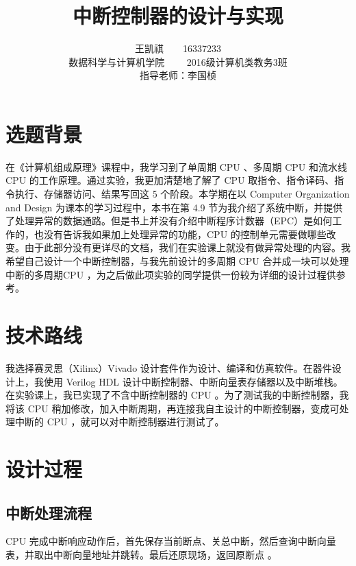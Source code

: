 \documentclass{article}
\begin{document}
\title{中断控制器的设计与实现}
\author {王凯祺\ \ \ \ 16337233 \\
数据科学与计算机学院 \ \ \ \ 2016级计算机类教务3班 \\
指导老师：李国桢
}
\maketitle

\tableofcontents

\newpage

\section{选题背景}

在《计算机组成原理》课程中，我学习到了单周期 CPU 、多周期 CPU 和流水线 CPU 的工作原理。通过实验，我更加清楚地了解了 CPU 取指令、指令译码、指令执行、存储器访问、结果写回这 5 个阶段。本学期在以 Computer Organization and Design \cite{COD} 为课本的学习过程中，本书在第 4.9 节为我介绍了系统中断，并提供了处理异常的数据通路。但是书上并没有介绍中断程序计数器（EPC）是如何工作的，也没有告诉我如果加上处理异常的功能，CPU 的控制单元需要做哪些改变。由于此部分没有更详尽的文档，我们在实验课上就没有做异常处理的内容。我希望自己设计一个中断控制器，与我先前设计的多周期 CPU 合并成一块可以处理中断的多周期CPU ，为之后做此项实验的同学提供一份较为详细的设计过程供参考。

\section{技术路线}

我选择赛灵思（Xilinx）Vivado 设计套件作为设计、编译和仿真软件。在器件设计上，我使用 Verilog HDL 设计中断控制器、中断向量表存储器以及中断堆栈。在实验课上，我已实现了不含中断控制器的 CPU 。为了测试我的中断控制器，我将该 CPU 稍加修改，加入中断周期，再连接我自主设计的中断控制器，变成可处理中断的 CPU ，就可以对中断控制器进行测试了。

\section{设计过程}

\subsection{中断处理流程}

CPU 完成中断响应动作后，首先保存当前断点、关总中断，然后查询中断向量表，并取出中断向量地址并跳转。最后还原现场，返回原断点 \cite{ARM} 。
\end{document}
